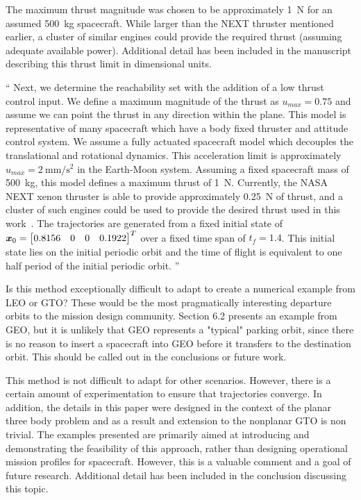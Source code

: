 \documentclass[11pt]{article}
\newenvironment{correction}{\begin{list}{}{\setlength{\leftmargin}{1cm}\setlength{\rightmargin}{1cm}}\vspace{\parsep}\item[]``}{''\end{list}}
\begin{document}
\begin{enumerate}
The maximum thrust magnitude was chosen to be approximately \SI{1}{\newton} for an assumed \SI{500}{\kilo\gram} spacecraft. 
While larger than the NEXT thruster mentioned earlier, a cluster of similar engines could provide the required thrust (assuming adequate available power). 
Additional detail has been included in the manuscript describing this thrust limit in dimensional units. 
\begin{correction}
Next, we determine the reachability set with the addition of a low thrust control input.
We define a maximum magnitude of the thrust as \( u_{max} = 0.75 \) and assume we can point the thrust in any direction within the plane. 
This model is representative of many spacecraft which have a body fixed thruster and attitude control system.
We assume a fully actuated spacecraft model which decouples the translational and rotational dynamics.
This acceleration limit is approximately \( u_{max} = \SI{2}{\milli\meter\per\second\squared} \) in the Earth-Moon system.
Assuming a fixed spacecraft mass of \SI{500}{\kilo\gram}, this model defines a maximum thrust of \SI{1}{\newton}.
Currently, the NASA NEXT xenon thruster is able to provide approximately \SI{0.25}{\newton} of thrust, and a cluster of such engines could be used to provide the desired thrust used in this work~\cite{schmidt2008}.
The trajectories are generated from a fixed initial state of \( \bm{x}_0 = \begin{bmatrix}0.8156 & 0 & 0 & 0.1922 \end{bmatrix}^T \) over a fixed time span of \( t_f = 1.4 \).
This initial state lies on the initial periodic orbit and the time of flight is equivalent to one half period of the initial periodic orbit. 
\end{correction}

\item 
    \begin{itshape}
Is this method exceptionally difficult to adapt to create a numerical example from LEO or GTO?  These would be the most pragmatically interesting departure orbits to the mission design community.  Section 6.2 presents an example from GEO, but it is unlikely that GEO represents a "typical" parking orbit, since there is no reason to insert a spacecraft into GEO before it transfers to the destination orbit.  This should be called out in the conclusions or future work.
\end{itshape}

This method is not difficult to adapt for other scenarios.
However, there is a certain amount of experimentation to ensure that trajectories converge. 
In addition, the details in this paper were designed in the context of the planar three body problem and as a result and extension to the nonplanar GTO is non trivial.
The examples presented are primarily aimed at introducing and demonstrating the feasibility of this approach, rather than designing operational mission profiles for spacecraft.
However, this is a valuable comment and a goal of future research. 
Additional detail has been included in the conclusion discussing this topic.


\end{enumerate}
\end{document}
